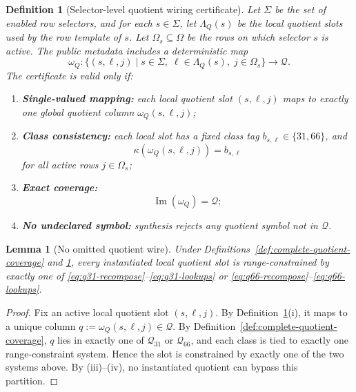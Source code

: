 ﻿\documentclass[11pt]{article}
\newtheorem{lemma}[theorem]{Lemma}
\newtheorem{definition}[theorem]{Definition}
\begin{document}
\begin{definition}[Selector-level quotient wiring certificate]
\label{def:selector-quotient-wiring}
Let \(\Sigma\) be the set of enabled row selectors, and for each
\(s\in\Sigma\), let \(\Lambda_Q(s)\) be the local quotient slots used by the
row template of \(s\). Let \(\Omega_s\subseteq \Omega\) be the rows on which
selector \(s\) is active. The public metadata includes a deterministic map
\[
\omega_Q:
\{(s,\ell,j)\mid s\in\Sigma,\;\ell\in\Lambda_Q(s),\;j\in\Omega_s\}
\to
\mathcal Q.
\]
The certificate is valid only if:
\begin{enumerate}[label=(\roman*),leftmargin=2em]
    \item \textbf{Single-valued mapping:} each local quotient slot \((s,\ell,j)\) maps
    to exactly one global quotient column \(\omega_Q(s,\ell,j)\);
    \item \textbf{Class consistency:} each local slot has a fixed class tag
    \(b_{s,\ell}\in\{31,66\}\), and
    \[
    \kappa(\omega_Q(s,\ell,j)) = b_{s,\ell}
    \]
    for all active rows \(j\in\Omega_s\);
    \item \textbf{Exact coverage:}
    \[
    \operatorname{Im}(\omega_Q)=\mathcal Q;
    \]
    \item \textbf{No undeclared symbol:} synthesis rejects any quotient symbol
    not in \(\mathcal Q\).
\end{enumerate}
\end{definition}

\begin{lemma}[No omitted quotient wire]
\label{lem:no-omitted-quotient-wire}
Under Definitions~\ref{def:complete-quotient-coverage} and
\ref{def:selector-quotient-wiring}, every instantiated local quotient slot is
range-constrained by exactly one of
\eqref{eq:q31-recompose}--\eqref{eq:q31-lookups} or
\eqref{eq:q66-recompose}--\eqref{eq:q66-lookups}.
\end{lemma}

\begin{proof}
Fix an active local quotient slot \((s,\ell,j)\). By
Definition~\ref{def:selector-quotient-wiring}(i), it maps to a unique column
\(q:=\omega_Q(s,\ell,j)\in\mathcal Q\). By
Definition~\ref{def:complete-quotient-coverage}, \(q\) lies in exactly one of
\(\mathcal Q_{31}\) or \(\mathcal Q_{66}\), and each class is tied to exactly
one range-constraint system. Hence the slot is constrained by exactly one of
the two systems above. By (iii)--(iv), no instantiated quotient can bypass this
partition.
\end{proof}
\end{document}
